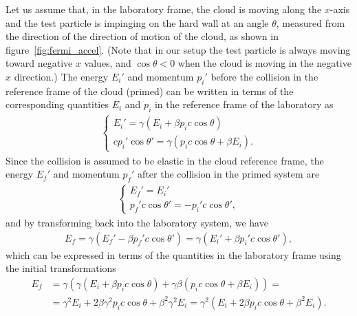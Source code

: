 Let us assume that, in the laboratory frame, the cloud is moving along the $x$-axis
and the test particle is impinging on the hard wall at an angle $\theta$, measured
from the direction of the direction of motion of the cloud, as shown in
figure~\ref{fig:fermi_accel}. (Note that in our setup the test particle is always
moving toward negative $x$ values, and $\cos\theta < 0$ when the cloud is moving
in the negative $x$ direction.)
The energy $E_i'$ and momentum $p_i'$ before the collision in the reference frame
of the cloud (primed) can be written in terms of the corresponding quantities $E_i$
and $p_i$ in the reference frame of the laboratory as
\begin{align*}
  \begin{cases}
    E_i' = \gamma(E_i + \beta p_i c\cos\theta)\\
    cp_i'\cos\theta' = \gamma(p_i c \cos\theta + \beta E_i).
  \end{cases}
\end{align*}
Since the collision is assumed to be elastic in the cloud reference frame, the energy
$E_f'$ and momentum $p_f'$ after the collision in the primed system are
\begin{align*}
  \begin{cases}
    E_f' = E_i'\\
    p_f'c\cos\theta' = - p_i'c\cos\theta',
  \end{cases}
\end{align*}
and by transforming back into the laboratory system, we have
\begin{align*}
  E_f = \gamma(E_f' - \beta p_f'c \cos\theta') =
  \gamma(E_i' + \beta p_i'c \cos\theta'),
\end{align*}
which can be expressed in terms of the quantities in the laboratory frame using the
initial transformations
\begin{align*}
  E_f &= \gamma \left(
  \gamma(E_i + \beta p_i c \cos\theta) +
  \gamma\beta(p_i c \cos\theta + \beta E_i)
  \right) =\\
  &= \gamma^2 E_i + 2 \beta \gamma^2 p_i c \cos\theta +
  \beta^2 \gamma^2 E_i =
  \gamma^2 \left( E_i + 2 \beta p_i c \cos\theta  + \beta^2 E_i \right).
\end{align*}

